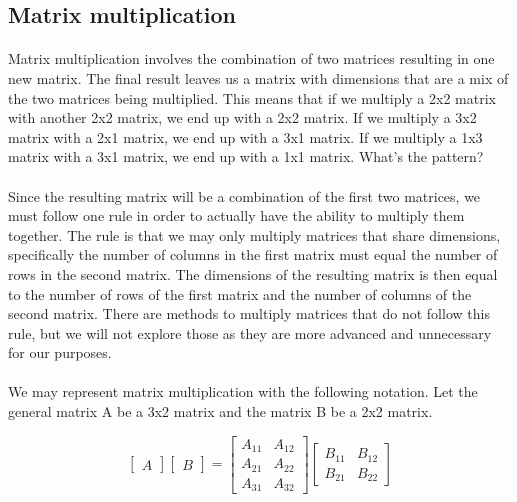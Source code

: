 \documentclass[12pt, letterpaper]{report}
\begin{document}
		\subsection{Matrix multiplication}
		\paragraph{} Matrix multiplication involves the combination of two matrices resulting in one new matrix. The final result leaves us a matrix with dimensions that are a mix of the two matrices being multiplied. This means that if we multiply a 2x2 matrix with another 2x2 matrix, we end up with a 2x2 matrix. If we multiply a 3x2 matrix with a 2x1 matrix, we end up with a 3x1 matrix. If we multiply a 1x3 matrix with a 3x1 matrix, we end up with a 1x1 matrix. What's the pattern?

		\paragraph{} Since the resulting matrix will be a combination of the first two matrices, we must follow one rule in order to actually have the ability to multiply them together. The rule is that we may only multiply matrices that share dimensions, specifically the number of columns in the first matrix must equal the number of rows in the second matrix. The dimensions of the resulting matrix is then equal to the number of rows of the first matrix and the number of columns of the second matrix. There are methods to multiply matrices that do not follow this rule, but we will not explore those as they are more advanced and unnecessary for our purposes.

		\paragraph{} We may represent matrix multiplication with the following notation. Let the general matrix A be a 3x2 matrix and the matrix B be a 2x2 matrix.

		\begin{equation}
		\begin{bmatrix}
		A
		\end{bmatrix}
		\begin{bmatrix}
		B
		\end{bmatrix}
		=
		\begin{bmatrix}
		A_{11} & A_{12}\\
		A_{21} & A_{22}\\
		A_{31} & A_{32}
		\end{bmatrix}
		\begin{bmatrix}
		B_{11} & B_{12}\\
		B_{21} & B_{22}
		\end{bmatrix}
		\end{equation}
\end{document}
